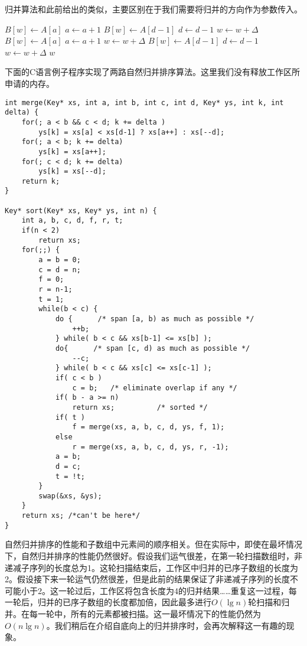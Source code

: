 \documentclass[UTF8]{article}
\begin{document}
归并算法和此前给出的类似，主要区别在于我们需要将归并的方向作为参数传入。

\begin{algorithmic}[1]
\Function{Merge}{$A, [a, b), [c, d), B, w, \Delta$}
      \State $B[w] \gets A[a]$
      \State $a \gets a + 1$
    \Else
      \State $B[w] \gets A[d-1]$
      \State $d \gets d - 1$
    \EndIf
    \State $w \gets w + \Delta$
  \EndWhile
    \State $B[w] \gets A[a]$
    \State $a \gets a + 1$
    \State $w \gets w + \Delta$
  \EndWhile
    \State $B[w] \gets A[d-1]$
    \State $d \gets d - 1$
    \State $w \gets w + \Delta$
  \EndWhile
  \State \Return $w$
\EndFunction
\end{algorithmic}

下面的C语言例子程序实现了两路自然归并排序算法。这里我们没有释放工作区所申请的内存。

\lstset{language=C}
\begin{lstlisting}
int merge(Key* xs, int a, int b, int c, int d, Key* ys, int k, int delta) {
    for(; a < b && c < d; k += delta )
        ys[k] = xs[a] < xs[d-1] ? xs[a++] : xs[--d];
    for(; a < b; k += delta)
        ys[k] = xs[a++];
    for(; c < d; k += delta)
        ys[k] = xs[--d];
    return k;
}

Key* sort(Key* xs, Key* ys, int n) {
    int a, b, c, d, f, r, t;
    if(n < 2)
        return xs;
    for(;;) {
        a = b = 0;
        c = d = n;
        f = 0;
        r = n-1;
        t = 1;
        while(b < c) {
            do {      /* span [a, b) as much as possible */
                ++b;
            } while( b < c && xs[b-1] <= xs[b] );
            do{      /* span [c, d) as much as possible */
                --c;
            } while( b < c && xs[c] <= xs[c-1] );
            if( c < b )
                c = b;   /* eliminate overlap if any */
            if( b - a >= n)
                return xs;          /* sorted */
            if( t )
                f = merge(xs, a, b, c, d, ys, f, 1);
            else
                r = merge(xs, a, b, c, d, ys, r, -1);
            a = b;
            d = c;
            t = !t;
        }
        swap(&xs, &ys);
    }
    return xs; /*can't be here*/
}
\end{lstlisting}

自然归并排序的性能和子数组中元素间的顺序相关。但在实际中，即使在最坏情况下，自然归并排序的性能仍然很好。假设我们运气很差，在第一轮扫描数组时，非递减子序列的长度总为1。这轮扫描结束后，工作区中归并的已序子数组的长度为2。假设接下来一轮运气仍然很差，但是此前的结果保证了非递减子序列的长度不可能小于2。这一轮过后，工作区将包含长度为4的归并结果……重复这一过程，每一轮后，归并的已序子数组的长度都加倍，因此最多进行$O(\lg n)$轮扫描和归并。在每一轮中，所有的元素都被扫描。这一最坏情况下的性能仍然为$O(n \lg n)$。我们稍后在介绍自底向上的归并排序时，会再次解释这一有趣的现象。
\end{document}

